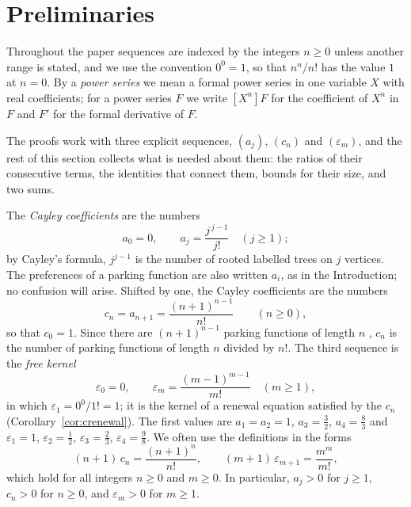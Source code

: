 \documentclass{amsart}
\makeatletter
\theoremstyle{definition}
\theoremstyle{remark}
\numberwithin{equation}{section}
\def\subsection{\@startsection{subsection}{2}\z@{.5\linespacing\@plus.7\linespacing}{-.5em}{\normalfont\bfseries\boldmath}}
\makeatother
\begin{document}
\section{Preliminaries}\label{sec:prelim}
Throughout the paper sequences are indexed by the integers $n\ge 0$ unless another range is stated, and we use the convention $0^0=1$, so that $n^n/n!$ has the value $1$ at $n=0$. By a \emph{power series} we mean a formal power series in one variable $X$ with real coefficients; for a power series $F$ we write $[X^n]F$ for the coefficient of $X^n$ in $F$ and $F'$ for the formal derivative of $F$.

The proofs work with three explicit sequences, $(a_j)$, $(c_n)$ and $(\varepsilon_m)$, and the rest of this section collects what is needed about them: the ratios of their consecutive terms, the identities that connect them, bounds for their size, and two sums.

\subsection{The numbers $a_j$, $c_n$ and $\varepsilon_m$}\label{subsec:prelim-numbers}

The \emph{Cayley coefficients} are the numbers
\[
a_0=0,\qquad a_j=\frac{j^{\,j-1}}{j!}\quad(j\ge 1);
\]
by Cayley's formula, $j^{j-1}$ is the number of rooted labelled trees on $j$ vertices. The preferences of a parking function are also written $a_i$, as in the Introduction; no confusion will arise. Shifted by one, the Cayley coefficients are the numbers
\[
c_n=a_{n+1}=\frac{(n+1)^{n-1}}{n!}\qquad(n\ge 0),
\]
so that $c_0=1$. Since there are $(n+1)^{n-1}$ parking functions of length $n$ \cite[Section~2]{foatariordan1974}, $c_n$ is the number of parking functions of length $n$ divided by $n!$. The third sequence is the \emph{free kernel}
\[
\varepsilon_0=0,\qquad \varepsilon_m=\frac{(m-1)^{m-1}}{m!}\quad(m\ge 1),
\]
in which $\varepsilon_1=0^0/1!=1$; it is the kernel of a renewal equation satisfied by the $c_n$ (Corollary~\ref{cor:crenewal}). The first values are $a_1=a_2=1$, $a_3=\frac32$, $a_4=\frac83$ and $\varepsilon_1=1$, $\varepsilon_2=\frac12$, $\varepsilon_3=\frac23$, $\varepsilon_4=\frac98$. We often use the definitions in the forms
\begin{equation}\label{eq:prelim-forms}
(n+1)\,c_n=\frac{(n+1)^{n}}{n!},\qquad (m+1)\,\varepsilon_{m+1}=\frac{m^{m}}{m!},
\end{equation}
which hold for all integers $n\ge 0$ and $m\ge 0$. In particular, $a_j>0$ for $j\ge 1$, $c_n>0$ for $n\ge 0$, and $\varepsilon_m>0$ for $m\ge 1$.
\end{document}
